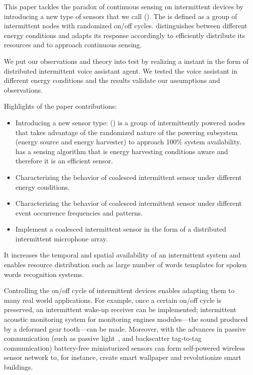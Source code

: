 This paper tackles the paradox of continuous sensing on intermittent devices by introducing a new type of sensors that we call \textit{\fullsys} (\sys). The \sys is defined as a group of intermittent nodes with randomized on/off cycles. \sys distinguishes between different energy conditions and adapts its response accordingly to efficiently distribute its resources and to approach continuous sensing.  

We put our observations and theory into test by realizing a \sys instant in the form of distributed intermittent voice assistant agent. We tested the voice assistant in different energy conditions and the results validate our assumptions and observations. 

Highlights of the paper contributions:
\begin{itemize}
		\item Introducing a new sensor type: \textit{\fullsys} (\sys) is a group of intermittently powered nodes that takes advantage of the randomized nature of the powering subsystem (energy source and energy harvester) to approach 100\% system availability. \sys has a sensing algorithm that is energy harvesting conditions aware and therefore it is an efficient sensor. 
		\item Characterizing the behavior of coalesced intermittent sensor under different energy conditions.
		\item Characterizing the behavior of coalesced intermittent sensor under different event occurrence frequencies and patterns. 
		\item Implement a coalesced intermittent sensor in the form of a distributed intermittent microphone array. 
\end{itemize}





%
 It increases the temporal and spatial availability of an intermittent system and enables resource distribution such as large number of words templates for spoken words recognition systems. 

Controlling the on/off cycle of intermittent devices enables adapting them to many real world applications. For example, once a certain on/off cycle is preserved, an intermittent wake-up receiver can be implemented; intermittent acoustic monitoring system for monitoring engines modules---the sound produced by a deformed gear tooth---can be made. Moreover, with the advances in passive communication (such as passive light~\cite{}, and backscatter tag-to-tag~\cite{} communication) battery-free miniaturized sensors can form self-powered wireless sensor network to, for instance, create smart wallpaper and revolutionize smart buildings. 


